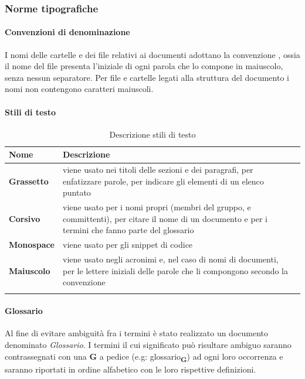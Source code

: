 {\subsubsection{Norme tipografiche}
\paragraph*{Convenzioni di denominazione}   
I nomi delle cartelle e dei file relativi ai documenti adottano la convenzione , ossia il nome del file presenta l'iniziale di ogni parola che lo compone in maiuscolo, senza nessun separatore. Per file e cartelle legati alla struttura del documento i nomi non contengono caratteri maiuscoli. 
\paragraph*{Stili di testo} 


	\setlength{\freewidth}{\dimexpr\textwidth-1\tabcolsep}
	\renewcommand{\arraystretch}{1.5}
	\setlength{\aboverulesep}{0pt}
	\setlength{\belowrulesep}{0pt}
	\begin{longtable}{L{.210\freewidth} L{.6\freewidth} L{.080\freewidth}}
		\toprule 
		\textbf{Nome} & \textbf{Descrizione} \\
		\toprule
		\endhead		
		\textbf{Grassetto} & viene usato nei titoli delle sezioni e dei paragrafi, per enfatizzare parole, per indicare gli elementi di un elenco puntato \\
		\textbf{Corsivo} & viene usato per i nomi propri (membri del gruppo,   e committenti), per citare il nome di un documento e per i termini che fanno parte del glossario\\
		\textbf{Monospace} & viene usato per gli snippet di codice \\
		\textbf{Maiuscolo} & viene usato negli acronimi e, nel caso di nomi di documenti, per le lettere iniziali delle parole che li compongono secondo la convenzione \textit{} \\
		\bottomrule
		\hiderowcolors
		\caption{Descrizione stili di testo}
	\end{longtable}
\paragraph*{Glossario}  
Al fine di evitare ambiguità fra i termini è stato realizzato un documento denominato \textit{Glossario}. I termini il cui significato può risultare ambiguo saranno contrassegnati con una \textbf{G} a pedice (e.g: \texorpdfstring{glossario\textsubscript{\textbf{G}}})) ad ogni loro occorrenza e saranno riportati in ordine alfabetico con le loro rispettive definizioni. 
}
